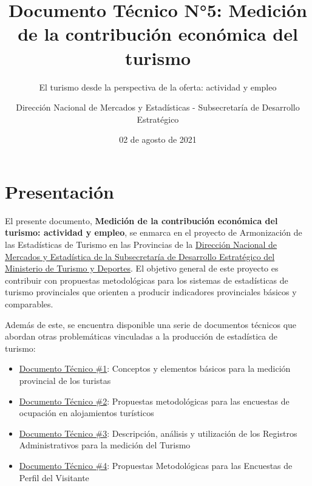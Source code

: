 \documentclass[
  openany]{book}
\title{Documento Técnico N°5: Medición de la contribución económica del turismo}
\subtitle{El turismo desde la perspectiva de la oferta: actividad y empleo}
\author{Dirección Nacional de Mercados y Estadísticas - Subsecretaría de Desarrollo Estratégico}
\date{02 de agosto de 2021}
\let\oldmaketitle\maketitle
\begin{document}
\maketitle


\newpage

\let\maketitle\oldmaketitle
\maketitle

{
\setcounter{tocdepth}{1}
\tableofcontents
}
\hypertarget{presentaciuxf3n}{%
\chapter*{Presentación}\label{presentaciuxf3n}}

El presente documento, \textbf{Medición de la contribución económica del turismo: actividad y empleo}, se enmarca en el proyecto de Armonización de las Estadísticas de Turismo en las Provincias de la \href{https://www.yvera.tur.ar/estadistica/}{Dirección Nacional de Mercados y Estadística de la Subsecretaría de Desarrollo Estratégico del Ministerio de Turismo y Deportes}. El objetivo general de este proyecto es contribuir con propuestas metodológicas para los sistemas de estadísticas de turismo provinciales que orienten a producir indicadores provinciales básicos y comparables.

Además de este, se encuentra disponible una serie de documentos técnicos que abordan otras problemáticas vinculadas a la producción de estadística de turismo:

\begin{itemize}
\item
  \href{https://dnme-minturdep.github.io/DT1_medicion_turismo/}{Documento Técnico \#1}: Conceptos y elementos básicos para la medición provincial de los turistas
\item
  \href{https://dnme-minturdep.github.io/DT2_encuestas/}{Documento Técnico \#2}: Propuestas metodológicas para las encuestas de ocupación en alojamientos turísticos
\item
  \href{https://dnme-minturdep.github.io/DT3_registros_adminsitrativos/}{Documento Técnico \#3}: Descripción, análisis y utilización de los Registros Administrativos para la medición del Turismo
\item
  \href{https://dnme-minturdep.github.io/DT4_perfiles/}{Documento Técnico \#4}: Propuestas Metodológicas para las Encuestas de Perfil del Visitante
\end{itemize}
\end{document}
